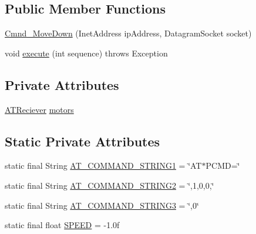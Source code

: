 \subsection*{Public Member Functions}
\begin{DoxyCompactItemize}
\item 
\hyperlink{class_drone_1_1_drone_commands_1_1_cmnd___move_down_ab3cc2ac9ced20e94c79203dce2572ad0}{Cmnd\+\_\+\+Move\+Down} (Inet\+Address ip\+Address, Datagram\+Socket socket)
\item 
void \hyperlink{class_drone_1_1_drone_commands_1_1_cmnd___move_down_ae8cd059ba42c2e72ec8920c76b726884}{execute} (int sequence)  throws Exception  	
\end{DoxyCompactItemize}
\subsection*{Private Attributes}
\begin{DoxyCompactItemize}
\item 
\hyperlink{class_drone_1_1_hardware_1_1_a_t_reciever}{A\+T\+Reciever} \hyperlink{class_drone_1_1_drone_commands_1_1_cmnd___move_down_a28208f0d23e215b444a6c4283f884a90}{motors}
\end{DoxyCompactItemize}
\subsection*{Static Private Attributes}
\begin{DoxyCompactItemize}
\item 
static final String \hyperlink{class_drone_1_1_drone_commands_1_1_cmnd___move_down_a9b7c84f944c1e2053ed2fc41500647a7}{A\+T\+\_\+\+C\+O\+M\+M\+A\+N\+D\+\_\+\+S\+T\+R\+I\+N\+G1} = \char`\"{}A\+T$\ast$P\+C\+M\+D=\char`\"{}
\item 
static final String \hyperlink{class_drone_1_1_drone_commands_1_1_cmnd___move_down_aa9c421179171f9753cfd784895d7cc58}{A\+T\+\_\+\+C\+O\+M\+M\+A\+N\+D\+\_\+\+S\+T\+R\+I\+N\+G2} = \char`\"{},1,0,0,\char`\"{}
\item 
static final String \hyperlink{class_drone_1_1_drone_commands_1_1_cmnd___move_down_af58d9251ce413156da0d8fd53bca1b09}{A\+T\+\_\+\+C\+O\+M\+M\+A\+N\+D\+\_\+\+S\+T\+R\+I\+N\+G3} = \char`\"{},0\char`\"{}
\item 
static final float \hyperlink{class_drone_1_1_drone_commands_1_1_cmnd___move_down_a83789dc4367eee37bd1a773b87c7282c}{S\+P\+E\+E\+D} = -\/1.\+0f
\end{DoxyCompactItemize}


